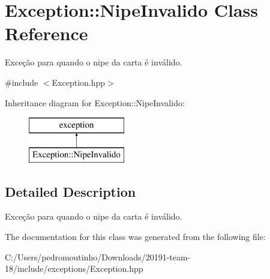 \hypertarget{class_exception_1_1_nipe_invalido}{}\section{Exception\+::Nipe\+Invalido Class Reference}
\label{class_exception_1_1_nipe_invalido}


Exceção para quando o nipe da carta é inválido.  




{\ttfamily \#include $<$Exception.\+hpp$>$}

Inheritance diagram for Exception\+::Nipe\+Invalido\+:\begin{figure}[H]
\begin{center}
\leavevmode
\includegraphics[height=2.000000cm]{class_exception_1_1_nipe_invalido}
\end{center}
\end{figure}


\subsection{Detailed Description}
Exceção para quando o nipe da carta é inválido. 



The documentation for this class was generated from the following file\+:\begin{DoxyCompactItemize}
\item 
C\+:/\+Users/pedromoutinho/\+Downloads/20191-\/team-\/18/include/exceptions/Exception.\+hpp\end{DoxyCompactItemize}
